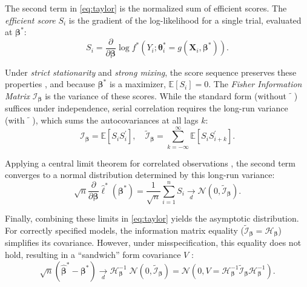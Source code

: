 \documentclass[00-main.tex]{subfiles}
\begin{document}
The second term in \eqref{eq:taylor} is the normalized sum of efficient scores. The \emph{efficient score} $S_i$ is the gradient of the log-likelihood for a single trial, evaluated at $\bm\beta^*$:
\begin{equation}
    S_i = \frac{\partial}{\partial\bm\beta} \log f^*(Y_i; \bm\theta^*_i = g(\bm{X}_i, \bm\beta^*)).
\end{equation}

Under \emph{strict stationarity} and \emph{strong mixing}, the score sequence preserves these properties \citep[Theorems~14.2 and 14.12]{hansen_econometrics_2022}, and because $\bm\beta^*$ is a maximizer, $\mathbb{E}[S_i]=0$. The \emph{Fisher Information Matrix} $\mathscr{I}_{\bm\beta}$ is the variance of these scores. While the standard form (without $\tilde{\phantom{x}}$) suffices under independence, serial correlation requires the long-run variance (with $\tilde{\phantom{x}}$), which sums the autocovariances at all lags $k$:
\begin{equation}
    \mathscr{I}_{\bm\beta} = \mathbb{E}[S_i S_i^\prime], \quad\tilde{\mathscr{I}}_{\bm\beta} = \sum_{k=-\infty}^{\infty} \mathbb{E}[S_i S_{i+k}^\prime].
\end{equation}

Applying a central limit theorem for correlated observations \citep[Theorem~14.15]{hansen_econometrics_2022}, the second term converges to a normal distribution determined by this long-run variance:
\begin{equation}
    \sqrt{n} \frac{\partial}{\partial\bm\beta} \hat{\ell}^*(\bm\beta^*) = \frac{1}{\sqrt{n}} \sum_{i=1}^n S_i \underset{d}{\to} \mathcal{N}(0, \tilde{\mathscr{I}}_{\bm\beta}).
\end{equation}

Finally, combining these limits in \eqref{eq:taylor} yields the asymptotic distribution. For correctly specified models, the information matrix equality ($\tilde{\mathscr{I}}_{\bm\beta} = \mathcal{H}_{\bm\beta}$) simplifies its covariance. However, under misspecification, this equality does not hold, resulting in a ``sandwich'' form covariance $V$ \citep[Theorem~10.16]{hansen_probability_2022}:
\begin{equation}
    \sqrt{n}(\hat{\bm\beta}^* - \bm\beta^*) \underset{d}{\to}  \mathcal{H}_{\bm\beta}^{-1}\;\mathcal{N} \left(0, \tilde{\mathscr{I}}_{\bm\beta}\right) = \mathcal{N}\left(0, V=\mathcal{H}_{\bm\beta}^{-1} \tilde{\mathscr{I}}_{\bm\beta} \mathcal{H}_{\bm\beta}^{-1}\right).
\end{equation}
\end{document}
